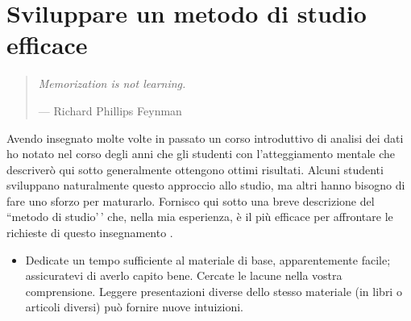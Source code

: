 \documentclass[
  10pt,
  italian,
  a4paper,
  extrafontsizes,onecolumn,openright
  ]{memoir}
\providecommand{\tightlist}{%
  \setlength{\itemsep}{0pt}\setlength{\parskip}{0pt}}
\theoremstyle{definition}
\theoremstyle{definition}
\theoremstyle{definition}
\theoremstyle{definition}
\theoremstyle{remark}
\begin{document}
\hypertarget{sviluppare-un-metodo-di-studio-efficace}{%
\section*{Sviluppare un metodo di studio efficace}\label{sviluppare-un-metodo-di-studio-efficace}}

\begin{quote}
\emph{Memorization is not learning.}

\hfill --- Richard Phillips Feynman
\end{quote}

Avendo insegnato molte volte in passato un corso introduttivo di analisi dei dati ho notato nel corso degli anni che gli studenti con l'atteggiamento mentale che descriverò qui sotto generalmente ottengono ottimi risultati. Alcuni studenti sviluppano naturalmente questo approccio allo studio, ma altri hanno bisogno di fare uno sforzo per maturarlo. Fornisco qui sotto una breve descrizione del ``metodo di studio'\,' che, nella mia esperienza, è il più efficace per affrontare le richieste di questo insegnamento \autocite{burger20125}.

\begin{itemize}
\tightlist
\item
  Dedicate un tempo sufficiente al materiale di base, apparentemente facile; assicuratevi di averlo capito bene. Cercate le lacune nella vostra comprensione. Leggere presentazioni diverse dello stesso materiale (in libri o articoli diversi) può fornire nuove intuizioni.
\end{itemize}
\end{document}
